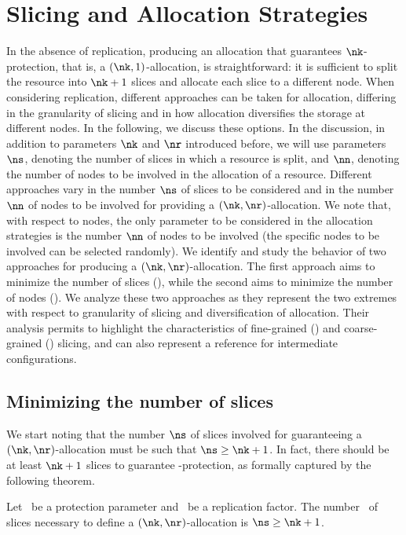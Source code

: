 \section[Strategies]{Slicing and Allocation Strategies}\label{dcs:sec:functions}

In the absence of replication, producing an allocation that guarantees
$\nk$-protection, that is, a $(\nk,1)$-allocation, is straightforward:
it is sufficient to split the resource into $\nk+1$ slices and
allocate each slice to a different node.  When considering
replication, different approaches can be taken for allocation,
differing in the granularity of slicing and in how allocation
diversifies the storage at different nodes.  In the following, we
discuss these options. In the discussion, in addition to parameters
$\nk$ and $\nr$ introduced before, we will use parameters $\ns$,
denoting the number of slices in which a resource is split, and $\nn$,
denoting the number of nodes to be involved in the allocation of a
resource.  Different approaches vary in the number $\ns$ of slices to
be considered and in the number $\nn$ of nodes to be involved for
providing a $(\nk,\nr)$-allocation.  We note that, with respect to
nodes, the only parameter to be considered in the allocation
strategies is the number $\nn$ of nodes to be involved (the specific
nodes to be involved can be selected randomly).  We identify and study
the behavior of two approaches for producing a $(\nk,\nr)$-allocation.
The first approach aims to minimize the number of slices (\Diagonal),
while the second aims to minimize the number of nodes (\Compact). We
analyze these two approaches as they represent the two extremes with
respect to granularity of slicing and diversification of
allocation. Their analysis permits to highlight the characteristics of
fine-grained (\Compact) and coarse-grained (\Diagonal) slicing, and
can also represent a reference for intermediate configurations.


\subsection{Minimizing the number of slices}\label{dcs:ss:diagonal}
 

We start noting that the number $\ns$ of slices involved for
guaranteeing a $(\nk,\nr)$-allocation must be such that $\ns \geq \nk
+1$. In fact, there should be at least $\nk+1$ slices to guarantee
\nk-protection, as formally captured by the following theorem.


\smallskip
\begin{theorem}
Let \nk\ be a protection parameter and \nr\ be a replication
factor. The number \ns\ of slices necessary to define a
$(\nk,\nr)$-allocation is $\ns \geq \nk+1$.
\end{theorem}
\smallskip



